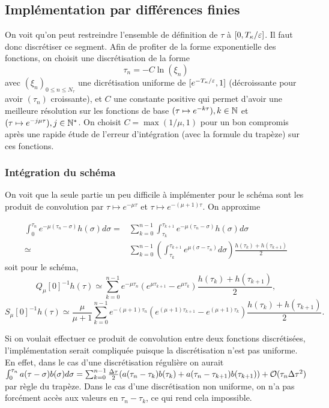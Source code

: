 \subsection{Implémentation par différences finies}

On voit qu'on peut restreindre l'ensemble de définition de $\tau$ à $[0,T_{\kappa}/\varepsilon]$. Il faut donc discrétiser ce segment. 
Afin de profiter de la forme exponentielle des fonctions, on choisit une discrétisation de la forme 
$$ \tau_n = -C\ln(\xi_n) $$ 
avec $(\xi_n)_{0\leq n \leq N_{\tau}}$ une dicrétisation uniforme de $[e^{-T_{\kappa}/\varepsilon},1]$ (décroissante pour avoir $(\tau_n)$ croissante), et $C$ une constante positive qui permet d'avoir une meilleure résolution sur les fonctions de base $(\tau\mapsto e^{-k\tau}), k\in\mathbb{N}$ et $(\tau\mapsto e^{-j\mu\tau}),j\in\mathbb{N}^*$. 
On choisit $C = \max(1/\mu,1)$ pour un bon compromis après une rapide étude de l'erreur d'intégration (avec la formule du trapèze) sur ces fonctions. \\

\subsubsection{Intégration du schéma}

On voit que la seule partie un peu difficile à implémenter pour le schéma sont les produit de convolution par $\tau\mapsto e^{-\mu\tau}$ et $\tau\mapsto e^{-(\mu+1)\tau}$. 
On approxime 

$$ \begin{array}{rl} \displaystyle
\int_0^{\tau_n} e^{-\mu(\tau_n-\sigma)}h(\sigma)d\sigma =& \displaystyle \sum_{k=0}^{n-1} \int_{\tau_{k}}^{\tau_{k+1}} e^{-\mu(\tau_n-\sigma)}h(\sigma)d\sigma \\
\simeq & \displaystyle \sum_{k=0}^{n-1} \left(\int_{\tau_k}^{\tau_{k+1}} e^{\mu(\sigma-\tau_n)} d\sigma \right)\frac{h(\tau_k)+h(\tau_{k+1})}{2}
\end{array} $$
soit pour le schéma, 
$$ Q_{\mu}[0]^{-1}h(\tau) \simeq \sum_{k=0}^{n-1} e^{-\mu\tau_n}(e^{\mu\tau_{k+1}}-e^{\mu\tau_k}) \frac{h(\tau_k)+h(\tau_{k+1})}{2}, $$
$$ S_{\mu}[0]^{-1}h(\tau) \simeq \frac{\mu}{\mu+1}\sum_{k=0}^{n-1} e^{-(\mu+1)\tau_n}(e^{(\mu+1)\tau_{k+1}}-e^{(\mu+1)\tau_k}) \frac{h(\tau_k)+h(\tau_{k+1})}{2}. $$

\begin{remark}
Si on voulait effectuer ce produit de convolution entre deux fonctions discrétisées, l'implémentation serait compliquée puisque la discrétisation n'est pas uniforme. 
En effet, dans le cas d'une discrétisation régulière on aurait 
$ \int_0^{\tau_n} a(\tau-\sigma)b(\sigma)d\sigma = \sum_{k = 0}^{n-1} \frac{\Delta\tau}{2} (a(\tau_n-\tau_k)b(\tau_k) + a(\tau_n - \tau_{k+1})b(\tau_{k+1})) + \mathcal{O}(\tau_n \Delta\tau^2)$ par règle du trapèze. 
Dans le cas d'une discrétisation non uniforme, on n'a pas forcément accès aux valeurs en $\tau_n-\tau_k$, ce qui rend cela impossible. 
\end{remark}

